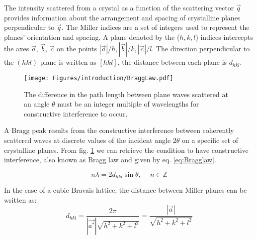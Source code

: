 The intensity scattered from a crystal as a function of the scattering vector $\vec{q}$ provides information about the arrangement and spacing of crystalline planes perpendicular to $\vec{q}$.
The Miller indices are a set of integers used to represent the planes' orientation and spacing.
A plane denoted by the ($h, k, l$) indices intercepts the axes $\vec{a}$, $\vec{b}$, $\vec{c}$ on the points $|\vec{a}|/h, |\vec{b}|/k, |\vec{c}|/l$.
The direction perpendicular to the $(hkl)$ plane is written as $[hkl]$, the distance between each plane is $d_{hkl}$.

\begin{figure}[!htb]
    \centering
    \texttt{[image: Figures/introduction/BraggLaw.pdf]}
    \caption{The difference in the path length between plane waves scattered at an angle $\theta$ must be an integer multiple of wavelengths for constructive interference to occur.}
    \label{fig:BraggLaw}
\end{figure}

A Bragg peak results from the constructive interference between coherently scattered waves at discrete values of the incident angle $2\theta$ on a specific set of crystalline planes.
From fig. \ref{fig:BraggLaw} we can retrieve the condition to have constructive interference, also known as Bragg law and given by eq. \eqref{eq:Bragglaw}.

\begin{equation}
    \label{eq:Bragglaw}
    n\lambda = 2d_{hkl} \sin{\theta}, \quad \ n \in \mathbb{Z}
\end{equation}


In the case of a cubic Bravais lattice, the distance between Miller planes can be written as:
\begin{equation}
    \label{eq:Interplanarspacing}
    d_{hkl}=\frac{2\pi}{|\vec{a^*}|\sqrt{h^2 + k^2 + l^2}}=\frac{|\vec{a}|}{\sqrt{h^2 + k^2 + l^2}}
\end{equation}


